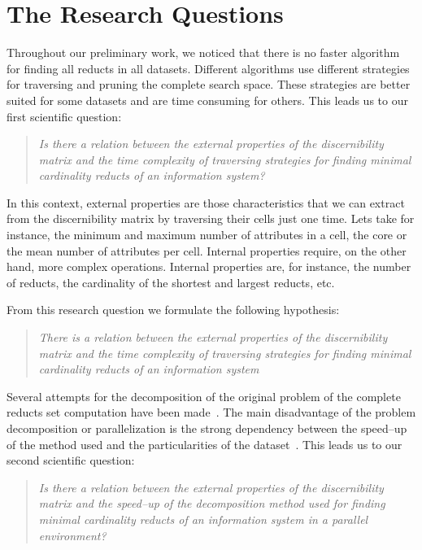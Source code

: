 \documentclass[11pt]{article}   %
\begin{document}
\section{The Research Questions}\label{ResearchQuestions} 
  Throughout our preliminary work, we noticed that there is no faster algorithm for finding all reducts in 
  all datasets. Different algorithms use different strategies for traversing and pruning the complete search 
  space. These strategies are better suited for some datasets and are time consuming for others. This leads 
  us to our first scientific question:
  
\begin{quote}
  \emph{Is there a relation between the external properties of the discernibility matrix and the time 
  		complexity of traversing strategies for finding minimal cardinality reducts of an information
  		system?}
\end{quote}
  		
  In this context, external properties are those characteristics that we can extract from the discernibility
  matrix by traversing their cells just one time. Lets take for instance, the minimum and maximum number of
  attributes in a cell, the core or the mean number of attributes per cell. Internal properties require, on 
  the other hand, more complex operations. Internal properties are, for instance, the number of reducts, the
  cardinality of the shortest and largest reducts, etc.
  
  From this research question we formulate the following hypothesis:
  
\begin{quote}  
  \emph{There is a relation between the external properties of the discernibility matrix and the time 
  		complexity of traversing strategies for finding minimal cardinality reducts of an information
  		system}
\end{quote}
  		
  Several attempts for the decomposition of the original problem of the complete reducts set computation have 
  been made~\cite{Strakowski08,Jiao10,Kopczynski14}. The main disadvantage of the problem decomposition or
  parallelization is the strong dependency between the speed--up of the method used and the particularities of 
  the dataset~\cite{Strakowski08}. This leads us to our second scientific question:
  
\begin{quote}
  \emph{Is there a relation between the external properties of the discernibility matrix and the 
  		speed--up of the decomposition method used for finding minimal cardinality reducts of an information
  		system in a parallel environment?}
\end{quote}
\end{document}
